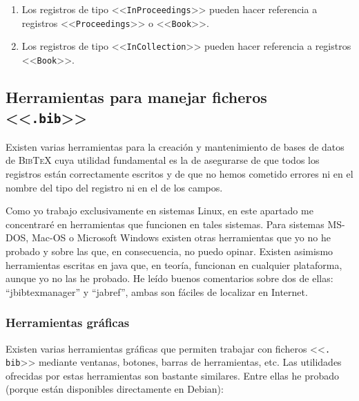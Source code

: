 \documentclass[a4paper,11pt]{article}
\def\btx-{\textsc{Bib\TeX}}
\def\ltr#1-{<<\texttt{#1}>>}
\def\tpf#1-{\ltr.#1-}
\begin{document}
\begin{enumerate}

\item  Los registros  de tipo  \ltr InProceedings-  pueden hacer  referencia a
  registros \ltr Proceedings- o \ltr Book-.

\item  Los registros  de tipo  \ltr  InCollection- pueden  hacer referencia  a
  registros \ltr Book-.

\end{enumerate}

\subsection{Herramientas para manejar ficheros \tpf bib-}
\label{sec:herr-para-manej}

Existen varias herramientas para la creación y mantenimiento de bases de datos
de  \btx- cuya  utilidad fundamental  es  la de  asegurarse de  que todos  los
registros están correctamente  escritos y de que no  hemos cometido errores ni
en el nombre del tipo del registro ni en el de los campos.

Como  yo  trabajo  exclusivamente  en  sistemas Linux,  en  este  apartado  me
concentraré en  herramientas que funcionen  en tales sistemas.   Para sistemas
MS-DOS, Mac-OS  o Microsoft  Windows existen otras  herramientas que yo  no he
probado y  sobre las que, en  consecuencia, no puedo  opinar. Existen asimismo
herramientas  escritas  en  java   que,  en  teoría,  funcionan  en  cualquier
plataforma, aunque yo no las he probado. He leído buenos comentarios sobre dos
de ellas: ``jbibtexmanager''  y ``jabref'', ambas son fáciles  de localizar en
Internet.

\subsubsection{Herramientas gráficas}
\label{sec:herr-graf}


Existen varias  herramientas gráficas que permiten trabajar  con ficheros \tpf
bib- mediante  ventanas, botones, barras de herramientas,  etc. Las utilidades
ofrecidas  por estas  herramientas  son bastante  similares.   Entre ellas  he
probado (porque están disponibles directamente en Debian):
\end{document}
